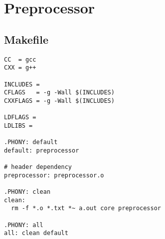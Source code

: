 \documentclass[11pt]{article}
\begin{document}
\newpage
\section{Preprocessor}

\subsection{Makefile}
\begin{listing}[H]
  \begin{verbatim}
CC  = gcc
CXX = g++

INCLUDES =
CFLAGS   = -g -Wall $(INCLUDES)
CXXFLAGS = -g -Wall $(INCLUDES)

LDFLAGS =
LDLIBS =

.PHONY: default
default: preprocessor

# header dependency
preprocessor: preprocessor.o

.PHONY: clean
clean:
  rm -f *.o *.txt *~ a.out core preprocessor

.PHONY: all
all: clean default
  \end{verbatim}
\end{listing}
\end{document}
